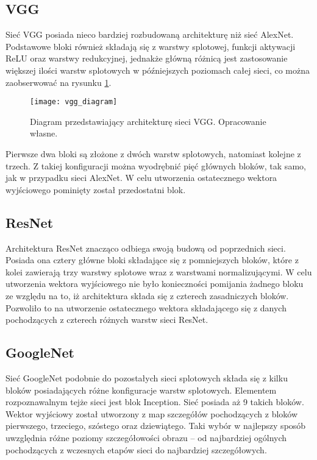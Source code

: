\subsection{VGG}
Sieć VGG \cite{vggnet} posiada nieco bardziej rozbudowaną architekturę niż sieć AlexNet. Podstawowe bloki również składają się z warstwy splotowej, funkcji aktywacji ReLU oraz warstwy redukcyjnej, jednakże główną różnicą jest zastosowanie większej ilości warstw splotowych w późniejszych poziomach całej sieci, co można zaobserwować na rysunku \ref{fig:vgg-diagram}.
\begin{figure}[H]
    \centering
    \texttt{[image: vgg\_diagram]}
    \caption{Diagram przedstawiający architekturę sieci VGG. Opracowanie własne.}
    \label{fig:vgg-diagram}
\end{figure}
\noindent Pierwsze dwa bloki są złożone z dwóch warstw splotowych, natomiast kolejne z trzech. Z takiej konfiguracji można wyodrębnić pięć głównych bloków, tak samo, jak w przypadku sieci AlexNet. W celu utworzenia ostatecznego wektora wyjściowego pominięty został przedostatni blok.
\subsection{ResNet}
Architektura ResNet \cite{resnet} znacząco odbiega swoją budową od poprzednich sieci. Posiada ona cztery główne bloki składające się z pomniejszych bloków, które z kolei zawierają trzy warstwy splotowe wraz z warstwami normalizującymi. W celu utworzenia wektora wyjściowego nie było konieczności pomijania żadnego bloku ze względu na to, iż architektura składa się z czterech zasadniczych bloków. Pozwoliło to na utworzenie ostatecznego wektora składającego się z danych pochodzących z czterech różnych warstw sieci ResNet.
\subsection{GoogleNet}
Sieć GoogleNet \cite{googlenet} podobnie do pozostałych sieci splotowych składa się z kilku bloków posiadających różne konfiguracje warstw splotowych. Elementem rozpoznawalnym tejże sieci jest blok Inception. Sieć posiada aż 9 takich bloków. Wektor wyjściowy został utworzony z map szczegółów pochodzących z bloków pierwszego, trzeciego, szóstego oraz dziewiątego. Taki wybór w najlepszy sposób uwzględnia różne poziomy szczegółowości obrazu -- od najbardziej ogólnych pochodzących z wczesnych etapów sieci do najbardziej szczegółowych.
